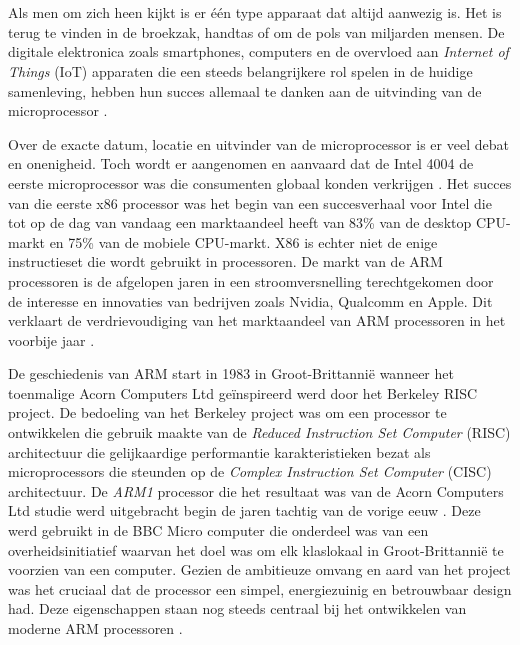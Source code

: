 
\chapter{}
\label{ch:inleiding}

Als men om zich heen kijkt is er één type apparaat dat altijd aanwezig is. Het is terug te vinden in de broekzak, handtas of om de pols van miljarden mensen. De digitale elektronica zoals smartphones, computers en de overvloed aan \textit{Internet of Things} (IoT) apparaten die een steeds belangrijkere rol spelen in de huidige samenleving, hebben hun succes allemaal te danken aan de uitvinding van de microprocessor \autocite{Malone1998}. 

Over de exacte datum, locatie en uitvinder van de microprocessor is er veel debat en onenigheid. Toch wordt er aangenomen en aanvaard dat de Intel 4004 de eerste microprocessor was die consumenten globaal konden verkrijgen \autocite{Aspray1997}. Het succes van die eerste x86 processor was het begin van een succesverhaal voor Intel die tot op de dag van vandaag een marktaandeel heeft van 83\% van de desktop CPU-markt en 75\% van de mobiele CPU-markt. X86 is echter niet de enige instructieset die wordt gebruikt in processoren. De markt van de ARM processoren is de afgelopen jaren in een stroomversnelling terechtgekomen door de interesse en innovaties van bedrijven zoals Nvidia, Qualcomm en Apple. Dit verklaart de verdrievoudiging van het marktaandeel van ARM processoren in het voorbije jaar \autocite{King2022}.

De geschiedenis van ARM start in 1983 in Groot-Brittannië wanneer het toenmalige Acorn Computers Ltd geïnspireerd werd door het Berkeley RISC project. De bedoeling van het Berkeley project was om een processor te ontwikkelen die gebruik maakte van de \textit{Reduced Instruction Set Computer} (RISC) architectuur die gelijkaardige performantie karakteristieken bezat als microprocessors die steunden op de \textit{Complex Instruction Set Computer} (CISC) architectuur. De \textit{ARM1} processor die het resultaat was van de Acorn Computers Ltd studie werd uitgebracht begin de jaren tachtig van de vorige eeuw \autocite{Ahammed2017}. Deze werd gebruikt in de BBC Micro computer die onderdeel was van een overheidsinitiatief waarvan het doel was om elk klaslokaal in Groot-Brittannië te voorzien van een computer. Gezien de ambitieuze omvang en aard van het project was het cruciaal dat de processor een simpel, energiezuinig en betrouwbaar design had. Deze eigenschappen staan nog steeds centraal bij het ontwikkelen van moderne ARM processoren \autocite{Walshe2015}.

